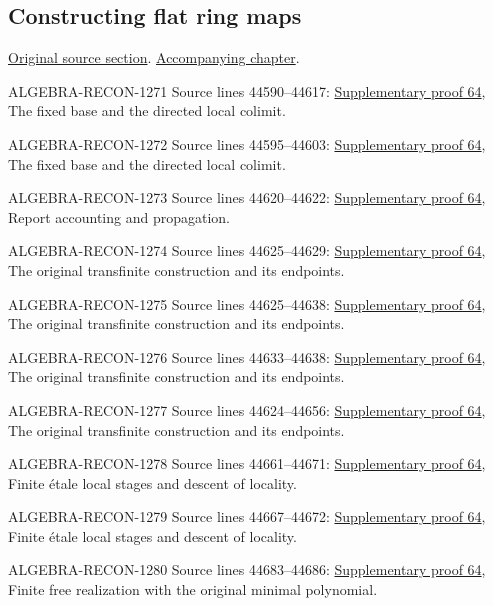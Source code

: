 \subsection{Constructing flat ring maps}
\hypertarget{algebra-source-section-constructing-flat}{}
\noindent\href{https://github.com/stacks/stacks-project/blob/a04446e57ec1fbc252a871afcec7752fb2807b14/algebra.tex\#L44566}{Original source section}. \href{algebra.pdf\#nameddest=section-constructing-flat}{Accompanying chapter}.

\begin{AlgebraSourceRoutes}
\item[ALGEBRA-RECON-1271] Source lines 44590--44617: \hyperlink{algebra_construct_flat_notes_20260929}{Supplementary proof 64}, The fixed base and the directed local colimit.
\item[ALGEBRA-RECON-1272] Source lines 44595--44603: \hyperlink{algebra_construct_flat_notes_20260929}{Supplementary proof 64}, The fixed base and the directed local colimit.
\item[ALGEBRA-RECON-1273] Source lines 44620--44622: \hyperlink{algebra_construct_flat_notes_20260929}{Supplementary proof 64}, Report accounting and propagation.
\item[ALGEBRA-RECON-1274] Source lines 44625--44629: \hyperlink{algebra_construct_flat_notes_20260929}{Supplementary proof 64}, The original transfinite construction and its endpoints.
\item[ALGEBRA-RECON-1275] Source lines 44625--44638: \hyperlink{algebra_construct_flat_notes_20260929}{Supplementary proof 64}, The original transfinite construction and its endpoints.
\item[ALGEBRA-RECON-1276] Source lines 44633--44638: \hyperlink{algebra_construct_flat_notes_20260929}{Supplementary proof 64}, The original transfinite construction and its endpoints.
\item[ALGEBRA-RECON-1277] Source lines 44624--44656: \hyperlink{algebra_construct_flat_notes_20260929}{Supplementary proof 64}, The original transfinite construction and its endpoints.
\item[ALGEBRA-RECON-1278] Source lines 44661--44671: \hyperlink{algebra_construct_flat_notes_20260929}{Supplementary proof 64}, Finite étale local stages and descent of locality.
\item[ALGEBRA-RECON-1279] Source lines 44667--44672: \hyperlink{algebra_construct_flat_notes_20260929}{Supplementary proof 64}, Finite étale local stages and descent of locality.
\item[ALGEBRA-RECON-1280] Source lines 44683--44686: \hyperlink{algebra_construct_flat_notes_20260929}{Supplementary proof 64}, Finite free realization with the original minimal polynomial.

\end{AlgebraSourceRoutes}

